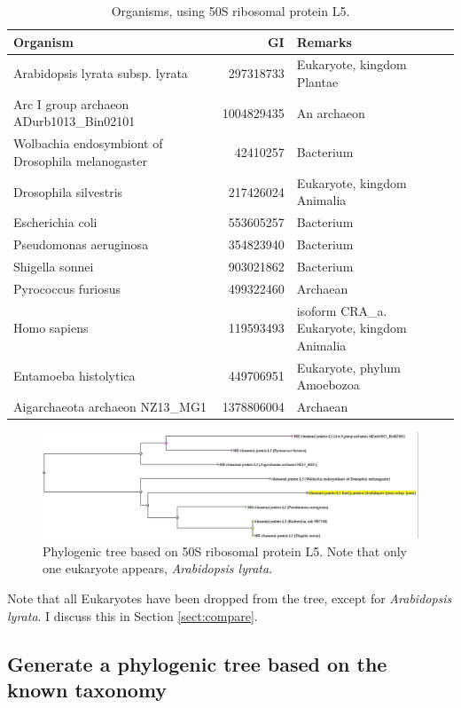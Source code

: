 \documentclass[]{article}
\begin{document}
\begin{table}[H]
	\caption{Organisms, using 50S ribosomal protein L5.}\label{tab:organisms}
	\centering
	\begin{tabular}{|l |r | p{5cm} |}
		\hline
		\textbf{Organism} & \textbf{GI} & \textbf{Remarks}\\ \hline
		Arabidopsis lyrata subsp. lyrata &297318733 & Eukaryote,  kingdom Plantae \\ \hline
		Arc I group archaeon ADurb1013\_Bin02101&1004829435&An archaeon\\ \hline
		Wolbachia endosymbiont of Drosophila melanogaster  &42410257 &Bacterium \\ \hline
		Drosophila silvestris&217426024&Eukaryote, kingdom Animalia\\\hline
		Escherichia coli &553605257 & Bacterium\\ \hline
		Pseudomonas aeruginosa &354823940 & Bacterium\\ \hline
		Shigella sonnei &903021862 &Bacterium \\ \hline
		Pyrococcus furiosus &499322460 &Archaean \\ \hline
		Homo sapiens & 119593493&isoform CRA\_a. Eukaryote, kingdom Animalia  \\ \hline
		Entamoeba histolytica  &449706951&Eukaryote, phylum Amoebozoa\\ \hline
		Aigarchaeota archaeon NZ13\_MG1&1378806004&Archaean\\ \hline
	\end{tabular}
\end{table}

\begin{figure}[H]
	\caption{Phylogenic tree based on 50S ribosomal protein L5.  Note that only one eukaryote appears, \textit{Arabidopsis lyrata}.}\label{fig:Phylo1}
	\includegraphics[width=\textwidth]{Phylo1}
\end{figure}

Note that all Eukaryotes have been dropped from the tree, except for  \textit{Arabidopsis lyrata}. I discuss this in Section \ref{sect:compare}.

\subsection{Generate a phylogenic tree based on the known taxonomy}
\end{document}
